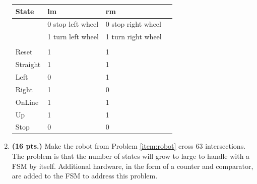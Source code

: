 \begin{enumerate}
\begin{solution}{
\begin{figure}[ht]
\end{figure}

\begin{tabular}{l|l|l|l}
State & lm		  & rm			\\ \hline
      & 0 stop left wheel & 0 stop right wheel  \\ \hline
      & 1 turn left wheel & 1 turn right wheel  \\ \hline
      &                   &                     \\ \hline \hline
Reset	 & 1		  & 1			\\ \hline
Straight & 1		  & 1			\\ \hline
Left     & 0		  & 1			\\ \hline
Right    & 1		  & 0			\\ \hline
OnLine   & 1		  & 1			\\ \hline
Up	 & 1		  & 1			\\ \hline
Stop	 & 0		  & 0			\\ 
\end{tabular}
} \end{solution} 

\item {\bf (16 pts.)}
Make the robot from Problem \ref{item:robot} cross 63 intersections.
The problem is that the number of states will grow to large to handle
with a FSM by itself.  Additional hardware, in the form of a counter 
and comparator, are added to the FSM to address this problem.


\end{enumerate}
